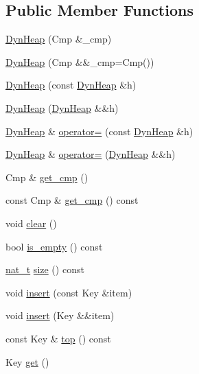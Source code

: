 \subsection*{Public Member Functions}
\begin{DoxyCompactItemize}
\item 
\hyperlink{class_designar_1_1_dyn_heap_a156ccf78397ff8c10a3badf417043a28}{Dyn\+Heap} (Cmp \&\+\_\+cmp)
\item 
\hyperlink{class_designar_1_1_dyn_heap_a0c0805141b81deafa1715d8b77bc1847}{Dyn\+Heap} (Cmp \&\&\+\_\+cmp=Cmp())
\item 
\hyperlink{class_designar_1_1_dyn_heap_ac9570139e90ddd5ef3cd12df8a06739d}{Dyn\+Heap} (const \hyperlink{class_designar_1_1_dyn_heap}{Dyn\+Heap} \&h)
\item 
\hyperlink{class_designar_1_1_dyn_heap_a7bb0017ca6c1f4753f561cd5a7779e97}{Dyn\+Heap} (\hyperlink{class_designar_1_1_dyn_heap}{Dyn\+Heap} \&\&h)
\item 
\hyperlink{class_designar_1_1_dyn_heap}{Dyn\+Heap} \& \hyperlink{class_designar_1_1_dyn_heap_abf024c994d3bf2ccea002640e7c8d528}{operator=} (const \hyperlink{class_designar_1_1_dyn_heap}{Dyn\+Heap} \&h)
\item 
\hyperlink{class_designar_1_1_dyn_heap}{Dyn\+Heap} \& \hyperlink{class_designar_1_1_dyn_heap_a231a0935e2a45fa4d18b94c5b64f1a24}{operator=} (\hyperlink{class_designar_1_1_dyn_heap}{Dyn\+Heap} \&\&h)
\item 
Cmp \& \hyperlink{class_designar_1_1_dyn_heap_a4f1357b3883f314adbd2b7bb100636b3}{get\+\_\+cmp} ()
\item 
const Cmp \& \hyperlink{class_designar_1_1_dyn_heap_a2c5b0b169216b30f44cc26338d3866b1}{get\+\_\+cmp} () const
\item 
void \hyperlink{class_designar_1_1_dyn_heap_a5a1f01a6b4859f9b329df3848561aa3d}{clear} ()
\item 
bool \hyperlink{class_designar_1_1_dyn_heap_a5f067624d97ebe3945adf21cb14af92f}{is\+\_\+empty} () const
\item 
\hyperlink{namespace_designar_aa72662848b9f4815e7bf31a7cf3e33d1}{nat\+\_\+t} \hyperlink{class_designar_1_1_dyn_heap_ab0b3254c032e032d2c7b0d98033fad8e}{size} () const
\item 
void \hyperlink{class_designar_1_1_dyn_heap_aba3a8286ddea8098ab89e18658ec1e3c}{insert} (const Key \&item)
\item 
void \hyperlink{class_designar_1_1_dyn_heap_a28d454d027e576f9fc6f1c888c5e8809}{insert} (Key \&\&item)
\item 
const Key \& \hyperlink{class_designar_1_1_dyn_heap_af6500577f6cfaab1ac768e76a4c43e6c}{top} () const
\item 
Key \hyperlink{class_designar_1_1_dyn_heap_adead89301910d07cf6e019ad35b549ad}{get} ()
\end{DoxyCompactItemize}


